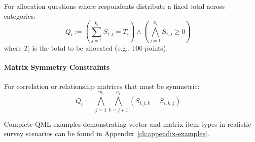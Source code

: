 For allocation questions where respondents distribute a fixed total across categories:
\[
Q_i := \left(\sum_{j=1}^{k_i} S_{i,j} = T_i\right) \land \left(\bigwedge_{j=1}^{k_i} S_{i,j} \geq 0\right)
\]
where $T_i$ is the total to be allocated (e.g., 100 points).

\paragraph{Matrix Symmetry Constraints}

For correlation or relationship matrices that must be symmetric:
\[
Q_i := \bigwedge_{j=1}^{m_i} \bigwedge_{k=j+1}^{n_i} (S_{i,j,k} = S_{i,k,j})
\]

Complete QML examples demonstrating vector and matrix item types in realistic survey scenarios can be found in Appendix~\ref{ch:appendix-examples}.
